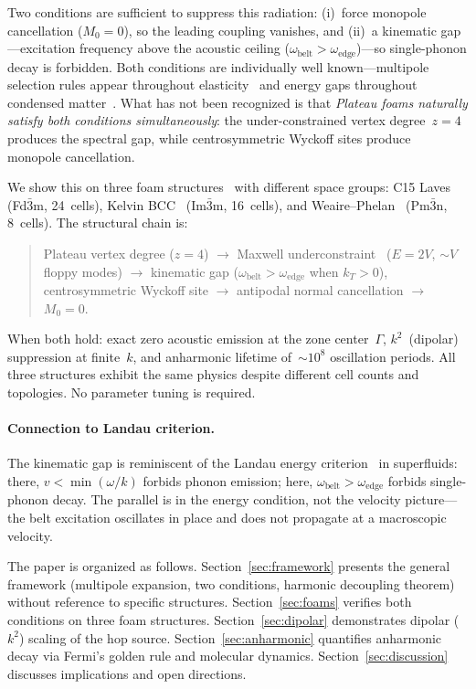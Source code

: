 \documentclass[12pt]{article}
\newcommand{\oedge}{\omega_{\mathrm{edge}}}
\newcommand{\obelt}{\omega_{\mathrm{belt}}}
\begin{document}
Two conditions are sufficient to suppress this radiation:
(i)~force monopole cancellation ($M_0 = 0$), so the leading coupling
vanishes, and (ii)~a kinematic gap---excitation frequency above the
acoustic ceiling ($\obelt > \oedge$)---so single-phonon decay is
forbidden.  Both conditions are individually
well known---multipole selection rules appear throughout
elasticity~\cite{Eshelby1951} and energy gaps throughout condensed
matter~\cite{Landau1941}.  What has not been recognized is that
\emph{Plateau foams naturally satisfy both conditions simultaneously}:
the under-constrained vertex degree~$z = 4$ produces the spectral
gap, while centrosymmetric Wyckoff sites produce monopole
cancellation.

We show this on three foam structures~\cite{Weaire1999} with
different space groups: C15 Laves~\cite{FrankKasper1958}
(Fd$\bar{3}$m, 24~cells), Kelvin BCC~\cite{Thomson1887}
(Im$\bar{3}$m, 16~cells), and Weaire--Phelan~\cite{WeairePhelan1994}
(Pm$\bar{3}$n, 8~cells).  The structural chain is:
\begin{quote}
Plateau vertex degree ($z = 4$) $\to$ Maxwell
underconstraint~\cite{Maxwell1864} ($E = 2V$, $\sim\!V$ floppy modes)
$\to$ kinematic gap ($\obelt > \oedge$ when $k_T > 0$),\\[2pt]
centrosymmetric Wyckoff site $\to$ antipodal normal cancellation $\to$
$M_0 = 0$.
\end{quote}
When both hold: exact zero acoustic emission at the zone
center~$\Gamma$, $k^2$~(dipolar) suppression at finite~$k$, and
anharmonic lifetime of~$\sim\!10^8$ oscillation periods.  All three
structures exhibit the same physics despite different cell counts and
topologies.  No parameter tuning is required.

\paragraph{Connection to Landau criterion.}
The kinematic gap is reminiscent of the Landau energy
criterion~\cite{Landau1941} in superfluids: there, $v < \min(\omega/k)$
forbids phonon emission; here, $\obelt > \oedge$ forbids single-phonon
decay.  The parallel is in the energy condition, not the velocity
picture---the belt excitation oscillates in place and does not
propagate at a macroscopic velocity.

The paper is organized as follows.  Section~\ref{sec:framework}
presents the general framework (multipole expansion, two conditions,
harmonic decoupling theorem) without reference to specific structures.
Section~\ref{sec:foams} verifies both conditions on three foam
structures.  Section~\ref{sec:dipolar} demonstrates dipolar ($k^2$)
scaling of the hop source.  Section~\ref{sec:anharmonic} quantifies
anharmonic decay via Fermi's golden rule and molecular dynamics.
Section~\ref{sec:discussion} discusses implications and open
directions.
\end{document}
